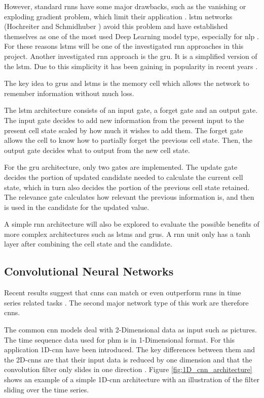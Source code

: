 \documentclass[conference]{IEEEtran}
\begin{document}
However, standard \glspl{rnn} have some major drawbacks, such as the vanishing or exploding gradient problem, which limit their application \cite{Bengio1994}. \gls{lstm} networks (Hochreiter and Schmidhuber \cite{Hochreiter1997}) avoid this problem and have established themselves as one of the most used Deep Learning model type, especially for \gls{nlp} \cite{Wu2016}. For these reasons \glspl{lstm} will be one of the investigated \gls{rnn} approaches in this project. Another investigated \gls{rnn} approach is the \gls{gru}. It is a simplified version of the \gls{lstm}. Due to this simplicity it has been gaining in popularity in recent years \cite{Rana2016}. 

The key idea to \glspl{gru} and \glspl{lstm} is the memory cell which allows the network to remember information without much loss.

The \gls{lstm} architecture consists of an input gate, a forget gate and an output gate. The input gate decides to add new information from the present input to the present cell state scaled by how much it wishes to add them. The forget gate allows the cell to know how to partially forget the previous cell state. Then, the output gate decides what to output from the new cell state.

For the \gls{gru} architecture, only two gates are implemented. The update gate decides the portion of updated candidate needed to calculate the current cell state, which in turn also decides the portion of the previous cell state retained. The relevance gate calculates how relevant the previous information is, and then is used in the candidate for the updated value.

A simple \gls{rnn} architecture will also be explored to evaluate the possible benefits of more complex architectures such as \glspl{lstm} and \glspl{gru}. A \gls{rnn} unit only has a tanh layer after combining the cell state and the candidate.

\subsection{Convolutional Neural Networks}
\label{sec:convolutional_neural_networks}

Recent results suggest that \glspl{cnn} can match or even outperform \glspl{rnn} in time series related tasks \cite{Bai2018}. The second major network type of this work are therefore \glspl{cnn}.

The common \gls{cnn} models deal with 2-Dimensional data as input such as pictures. The time sequence data used for \gls{phm} is in 1-Dimensional format. For this application 1D-\gls{cnn} have been introduced. The key differences between them and the 2D-\glspl{cnn} are that their input data is reduced by one dimension and that the convolution filter only slides in one direction \cite{Akrim2021}. Figure \ref{fig:1D_cnn_architecture} shows an example of a simple 1D-\gls{cnn} architecture with an illustration of the filter sliding over the time series. 
\end{document}
